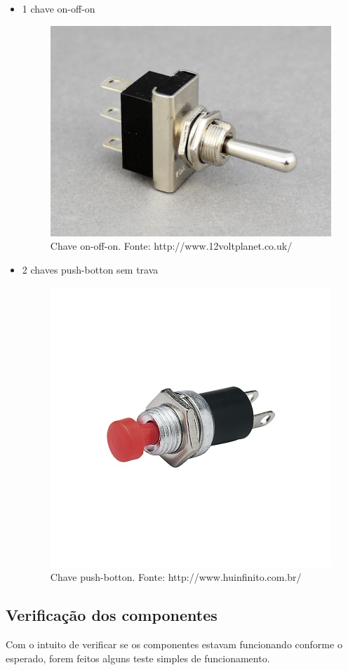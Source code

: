 \documentclass[conference]{IEEEtran}
\begin{document}
\begin{itemize}
	\item 1 chave on-off-on
\begin{figure}
	\centering
	\includegraphics[width=0.7\linewidth]{switch}
	\caption{Chave on-off-on. Fonte: http://www.12voltplanet.co.uk/}
	\label{fig:switch}
\end{figure}
	
	\item 2 chaves push-botton sem trava
\begin{figure}
	\centering
	\includegraphics[width=0.7\linewidth]{push}
	\caption{Chave push-botton. Fonte: http://www.huinfinito.com.br/}
	\label{fig:push}
\end{figure}

\end{itemize}

\subsection{Verificação dos componentes}
Com o intuito de verificar se os componentes estavam funcionando conforme o esperado, forem feitos alguns teste simples de funcionamento. 
\end{document}
